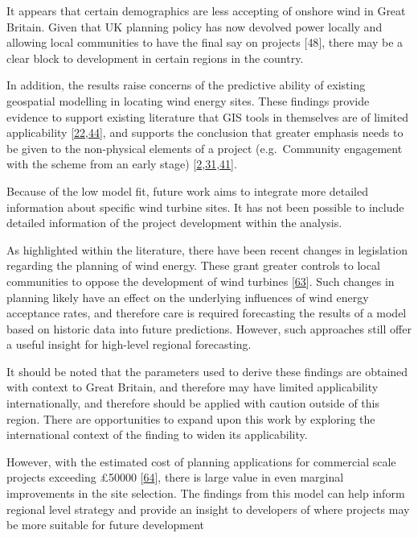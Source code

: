 \documentclass[a4paper,]{article}
\theoremstyle{definition}
\theoremstyle{definition}
\theoremstyle{definition}
\theoremstyle{remark}
\begin{document}
It appears that certain demographics are less accepting of onshore wind
in Great Britain. Given that UK planning policy has now devolved power
locally and allowing local communities to have the final say on projects
{[}48{]}, there may be a clear block to development in certain regions
in the country.

In addition, the results raise concerns of the predictive ability of
existing geospatial modelling in locating wind energy sites. These
findings provide evidence to support existing literature that GIS tools
in themselves are of limited applicability
{[}\protect\hyperlink{ref-Malczewski2004}{22},\protect\hyperlink{ref-Toke2005}{44}{]},
and supports the conclusion that greater emphasis needs to be given to
the non-physical elements of a project (e.g.~Community engagement with
the scheme from an early stage)
{[}\protect\hyperlink{ref-Wolsink2000}{2},\protect\hyperlink{ref-Toke2008}{31},\protect\hyperlink{ref-Warren2010}{41}{]}.

Because of the low model fit, future work aims to integrate more
detailed information about specific wind turbine sites. It has not been
possible to include detailed information of the project development
within the analysis.

As highlighted within the literature, there have been recent changes in
legislation regarding the planning of wind energy. These grant greater
controls to local communities to oppose the development of wind turbines
{[}\protect\hyperlink{ref-Smith2016}{63}{]}. Such changes in planning
likely have an effect on the underlying influences of wind energy
acceptance rates, and therefore care is required forecasting the results
of a model based on historic data into future predictions. However, such
approaches still offer a useful insight for high-level regional
forecasting.

It should be noted that the parameters used to derive these findings are
obtained with context to Great Britain, and therefore may have limited
applicability internationally, and therefore should be applied with
caution outside of this region. There are opportunities to expand upon
this work by exploring the international context of the finding to widen
its applicability.

However, with the estimated cost of planning applications for commercial
scale projects exceeding \pounds 50000
{[}\protect\hyperlink{ref-RF2016}{64}{]}, there is large value in even
marginal improvements in the site selection. The findings from this
model can help inform regional level strategy and provide an insight to
developers of where projects may be more suitable for future development
\end{document}
